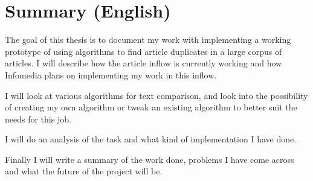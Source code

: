 \chapter{Summary (English)}

The goal of this thesis is to document my work with implementing a working prototype of using algorithms to find article duplicates in a large corpus of articles. I will describe how the article inflow is currently working and how Infomedia plans on implementing my work in this inflow.

I will look at various algorithms for text comparison, and look into the possibility of creating my own algorithm or tweak an existing algorithm to better suit the needs for this job.

I will do an analysis of the task and what kind of implementation I have done.

Finally I will write a summary of the work done, problems I have come across and what the future of the project will be.